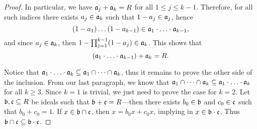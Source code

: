 \begin{proof}
    In particular, we have \(\mathfrak{a}_j + \mathfrak{a}_k = R\) for all \(1 \leq j \leq
    k - 1\). Therefore, for all such indices there exists \(a_j \in \mathfrak{a}_k\)
    such that \(1 - a_j \in \mathfrak{a}_j\), hence
    \[
        (1 - a_1) \dots (1 - a_{k-1}) \in
        \mathfrak{a}_1 \cdot \ldots \cdot \mathfrak{a}_{k-1},
    \]
    and since \(a_j \in \mathfrak{a}_k\), then
    \(1 - \prod_{j=1}^{k-1} (1 - a_j) \in \mathfrak{a}_k\). This shows that
    \begin{equation}\label{eq:coprime-ideals-CRT}
        (\mathfrak{a}_1 \cdot \ldots \cdot \mathfrak{a}_{k-1}) + \mathfrak{a}_k = R.
    \end{equation}

    Notice that
    \(\mathfrak{a}_1 \cdot \ldots \cdot \mathfrak{a}_k \subseteq \mathfrak{a}_1 \cap \dots \cap
    \mathfrak{a}_k\), thus it remains to prove the other side of the inclusion. From our
    last paragraph, we know that
    \(\mathfrak{a}_1 \cap \dots \cap \mathfrak{a}_k \subseteq \mathfrak{a}_1 \cdot \ldots \cdot
    \mathfrak{a}_k \) for all \(k \geq 3\). Since \(k = 1\) is trivial, we just need to
    prove the case for \(k = 2\). Let \(\mathfrak{b}, \mathfrak{c} \subseteq R\) be ideals
    such that \(\mathfrak{b} + \mathfrak{c} = R\)---then there exists \(b_0 \in \mathfrak{b}\)
    and \(c_0 \in \mathfrak{c}\) such that \(b_0 + c_0 = 1\). If \(x \in \mathfrak{b} \cap
    \mathfrak{c}\), then \(x = b_0 x + c_0 x\), implying in \(x \in \mathfrak{b} \cdot
    \mathfrak{c}\). Thus \(\mathfrak{b} \cap \mathfrak{c} \subseteq \mathfrak{b} \cdot \mathfrak{c}\).


\end{proof}

